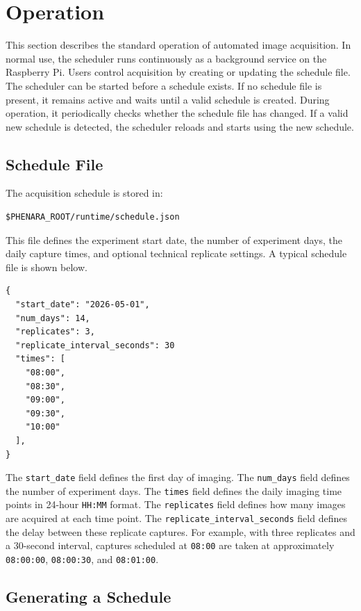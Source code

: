 \section{Operation}

This section describes the standard operation of automated image acquisition.
In normal use, the scheduler runs continuously as a background service on the
Raspberry Pi. Users control acquisition by creating or updating the schedule
file. The scheduler can be started before a schedule exists. If no schedule
file is present, it remains active and waits until a valid schedule is created.
During operation, it periodically checks whether the schedule file has changed.
If a valid new schedule is detected, the scheduler reloads and starts using the
new schedule.

\subsection{Schedule File}

The acquisition schedule is stored in:

\begin{verbatim}
$PHENARA_ROOT/runtime/schedule.json
\end{verbatim}

This file defines the experiment start date, the number of experiment days, the
daily capture times, and optional technical replicate settings. A typical
schedule file is shown below.

\begin{verbatim}
{
  "start_date": "2026-05-01",
  "num_days": 14,
  "replicates": 3,
  "replicate_interval_seconds": 30
  "times": [
    "08:00",
    "08:30",
    "09:00",
    "09:30",
    "10:00"
  ],
}
\end{verbatim}

The \texttt{start\_date} field defines the first day of imaging. The
\texttt{num\_days} field defines the number of experiment days. The
\texttt{times} field defines the daily imaging time points in 24-hour
\texttt{HH:MM} format. The \texttt{replicates} field defines how many images
are acquired at each time point. The \texttt{replicate\_interval\_seconds}
field defines the delay between these replicate captures. For example, with
three replicates and a 30-second interval, captures scheduled at \texttt{08:00}
are taken at approximately \texttt{08:00:00}, \texttt{08:00:30}, and
\texttt{08:01:00}.

\subsection{Generating a Schedule}

